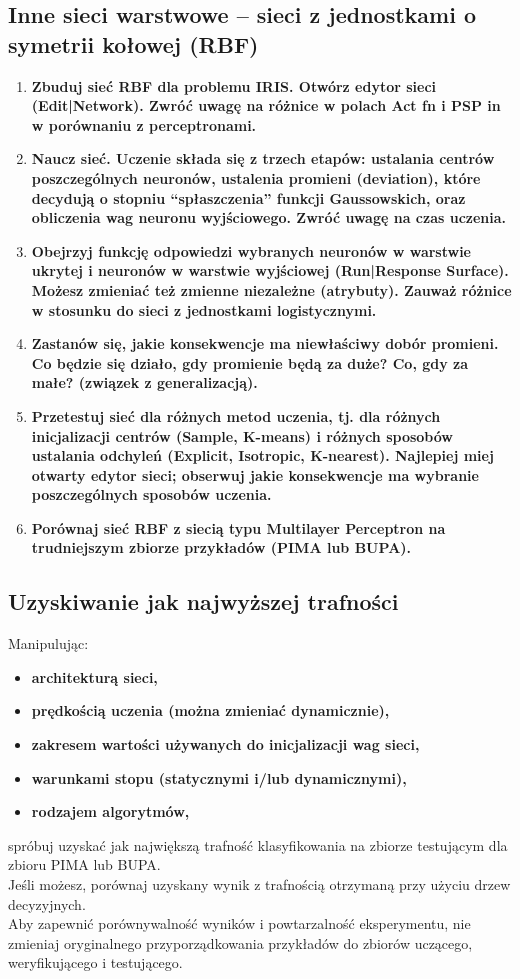 \subsection{Inne sieci warstwowe – sieci z jednostkami o symetrii kołowej (RBF)}
\begin{enumerate}
\item \textbf{Zbuduj sieć RBF dla problemu IRIS.
Otwórz edytor sieci (Edit|Network). Zwróć uwagę na różnice w polach Act fn i PSP in w porównaniu z perceptronami.}

\item \textbf{
Naucz sieć. Uczenie składa się z trzech etapów: ustalania centrów poszczególnych neuronów, ustalenia promieni (deviation), które decydują o stopniu “spłaszczenia” funkcji Gaussowskich, oraz obliczenia wag neuronu wyjściowego. Zwróć uwagę na czas uczenia.}

\item \textbf{
Obejrzyj funkcję odpowiedzi wybranych neuronów w warstwie ukrytej i neuronów w warstwie wyjściowej (Run|Response Surface). Możesz zmieniać też zmienne niezależne (atrybuty). Zauważ różnice w stosunku do sieci z jednostkami logistycznymi.}

\item \textbf{
Zastanów się, jakie konsekwencje ma niewłaściwy dobór promieni. Co będzie się działo, gdy promienie będą za duże? Co, gdy za małe? (związek z generalizacją).}

\item \textbf{
Przetestuj sieć dla różnych metod uczenia, tj. dla różnych inicjalizacji centrów (Sample, K-means) i różnych sposobów ustalania odchyleń (Explicit, Isotropic, K-nearest). Najlepiej miej otwarty edytor sieci; obserwuj jakie konsekwencje ma wybranie poszczególnych sposobów uczenia.}

\item \textbf{
Porównaj sieć RBF z siecią typu Multilayer Perceptron na trudniejszym zbiorze przykładów (PIMA lub BUPA).}
\end{enumerate}

\subsection{ Uzyskiwanie jak najwyższej trafności}
Manipulując:
\begin{itemize}
\item \textbf{architekturą sieci,}
\item \textbf{prędkością uczenia (można zmieniać dynamicznie),}
\item \textbf{zakresem wartości używanych do inicjalizacji wag sieci,}
\item \textbf{warunkami stopu (statycznymi i/lub dynamicznymi),}
\item \textbf{rodzajem algorytmów,}
\end{itemize}
spróbuj uzyskać jak największą trafność klasyfikowania na zbiorze testującym dla zbioru PIMA lub BUPA.
\\Jeśli możesz, porównaj uzyskany wynik z trafnością otrzymaną przy użyciu drzew decyzyjnych.
\\Aby zapewnić porównywalność wyników i powtarzalność eksperymentu, nie zmieniaj oryginalnego przyporządkowania przykładów do zbiorów uczącego, weryfikującego i testującego.